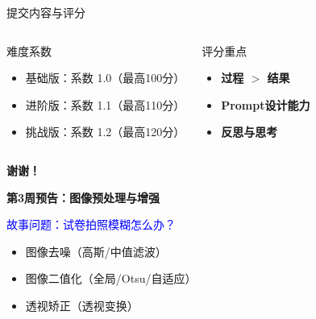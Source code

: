 \begin{frame}{提交内容与评分}
\begin{columns}
		\vspace{0.2cm}

		\begin{block}{难度系数}
		\begin{itemize}
			\item 基础版：系数 1.0（最高100分）
			\item 进阶版：系数 1.1（最高110分）
			\item 挑战版：系数 1.2（最高120分）
		\end{itemize}
		\end{block}

		\vspace{0.2cm}

		\begin{alertblock}{评分重点}
			\begin{itemize}
				\item \textbf{过程 $>$ 结果}
				\item \textbf{Prompt设计能力}
				\item \textbf{反思与思考}
			\end{itemize}
		\end{alertblock}
	\end{columns}
\end{frame}


\begin{frame}
	\begin{center}
		\Huge \textbf{谢谢！}

		\vspace{1cm}

		\Large
		\textbf{第3周预告：图像预处理与增强}

		\vspace{0.5cm}

		\normalsize
		\textcolor{blue}{故事问题：试卷拍照模糊怎么办？}

		\vspace{0.3cm}

		\begin{itemize}
			\item 图像去噪（高斯/中值滤波）
			\item 图像二值化（全局/Otsu/自适应）
			\item 透视矫正（透视变换）
		\end{itemize}
	\end{center}
\end{frame}
